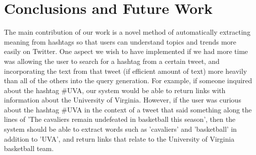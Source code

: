 \documentclass{sig-alternate}
\begin{document}
\section{Conclusions and Future Work}
The main contribution of our work is a novel method of automatically extracting meaning from hashtags so that users can understand topics and trends more easily on Twitter. 
One aspect we wish to have implemented if we had more time was allowing the user to search for a hashtag from a certain tweet, and incorporating the text from that tweet (if efficient amount of text) more heavily than all of the others into the query generation. For example, if someone inquired about the hashtag \#UVA, our system would be able to return links with information about the University of Virginia. However, if the user was curious about the hashtag \#UVA in the context of a tweet that said something along the lines of 'The cavaliers remain undefeated in basketball this season', then the system should be able to extract words such as 'cavaliers' and 'basketball' in addition to 'UVA', and return links that relate to the University of Virginia basketball team.



\end{document}
